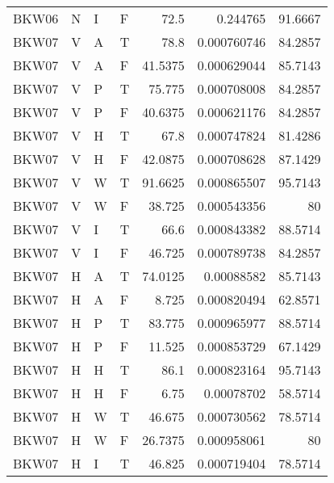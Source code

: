 \begin{longtable}{llllrrr}
    BKW06    & N         & I         & F          & 72.5       & 0.244765    & 91.6667  \\
    BKW07    & V         & A         & T          & 78.8       & 0.000760746 & 84.2857  \\
    BKW07    & V         & A         & F          & 41.5375    & 0.000629044 & 85.7143  \\
    BKW07    & V         & P         & T          & 75.775     & 0.000708008 & 84.2857  \\
    BKW07    & V         & P         & F          & 40.6375    & 0.000621176 & 84.2857  \\
    BKW07    & V         & H         & T          & 67.8       & 0.000747824 & 81.4286  \\
    BKW07    & V         & H         & F          & 42.0875    & 0.000708628 & 87.1429  \\
    BKW07    & V         & W         & T          & 91.6625    & 0.000865507 & 95.7143  \\
    BKW07    & V         & W         & F          & 38.725     & 0.000543356 & 80       \\
    BKW07    & V         & I         & T          & 66.6       & 0.000843382 & 88.5714  \\
    BKW07    & V         & I         & F          & 46.725     & 0.000789738 & 84.2857  \\
    BKW07    & H         & A         & T          & 74.0125    & 0.00088582  & 85.7143  \\
    BKW07    & H         & A         & F          & 8.725      & 0.000820494 & 62.8571  \\
    BKW07    & H         & P         & T          & 83.775     & 0.000965977 & 88.5714  \\
    BKW07    & H         & P         & F          & 11.525     & 0.000853729 & 67.1429  \\
    BKW07    & H         & H         & T          & 86.1       & 0.000823164 & 95.7143  \\
    BKW07    & H         & H         & F          & 6.75       & 0.00078702  & 58.5714  \\
    BKW07    & H         & W         & T          & 46.675     & 0.000730562 & 78.5714  \\
    BKW07    & H         & W         & F          & 26.7375    & 0.000958061 & 80       \\
    BKW07    & H         & I         & T          & 46.825     & 0.000719404 & 78.5714  \\

\end{longtable}
